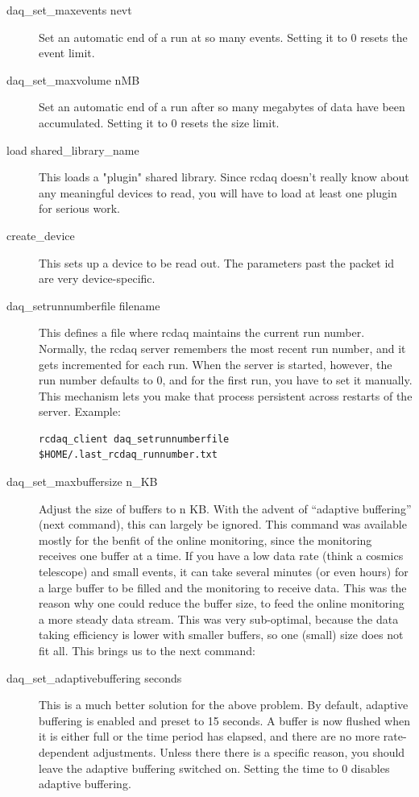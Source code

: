 \documentclass{article}[11pt]
\begin{document}
\begin{description}
\item[daq\_set\_maxevents nevt] Set an automatic end of a run at
  so many events. Setting it to 0 resets the event limit.

\item[daq\_set\_maxvolume nMB] Set an automatic end of a run
  after so many megabytes of data have been accumulated. Setting it to
  0 resets the size limit.

\item[load shared\_library\_name] This loads a "plugin" shared
  library. Since rcdaq doesn't really know about any meaningful
  devices to read, you will have to load at least one plugin for
  serious work.

\item[create\_device]
  This sets up a device to be read out. The parameters past the packet
  id are very device-specific. 

\item[daq\_setrunnumberfile filename] This defines a file where
  rcdaq maintains the current run number. Normally, the rcdaq server
  remembers the most recent run number, and it gets incremented for each run.
  When the server is started, however, the run number defaults to 0, and for the
  first run, you have to set it manually. This mechanism lets you make that 
  process persistent across restarts of the server. Example:

\begin{verbatim}
rcdaq_client daq_setrunnumberfile $HOME/.last_rcdaq_runnumber.txt
\end{verbatim}

\item[daq\_set\_maxbuffersize n\_KB] Adjust the size of buffers to n
  KB. With the advent of ``adaptive buffering'' (next command), this
  can largely be ignored. This command was available mostly for the
  benfit of the online monitoring, since the monitoring receives one
  buffer at a time. If you have a low data rate (think a cosmics
  telescope) and small events, it can take several minutes (or even
  hours) for a large buffer to be filled and the monitoring to receive
  data. This was the reason why one could reduce the buffer size, to
  feed the online monitoring a more steady data stream. This was very
  sub-optimal, because the data taking efficiency is lower with
  smaller buffers, so one (small) size does not fit all. This brings
  us to the next command:

\item[daq\_set\_adaptivebuffering seconds] This is a much better
  solution for the above problem. By default, adaptive buffering is
  enabled and preset to 15 seconds.  A buffer is now flushed when it
  is either full or the time period has elapsed, and there are no more
  rate-dependent adjustments. Unless there there is a specific reason,
  you should leave the adaptive buffering switched on. Setting the
  time to 0 disables adaptive buffering.


\end{description}
\end{document}
